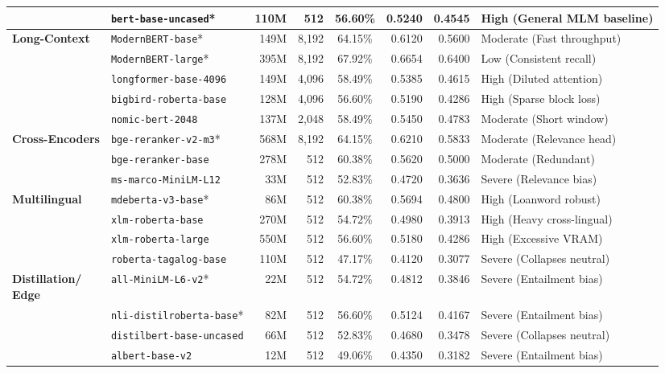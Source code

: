 \begin{landscape}
\begin{table}[p]
\begin{tabularx}{\linewidth}{>{\RaggedRight\arraybackslash}p{2.8cm}>{\RaggedRight\arraybackslash}p{4.6cm}rrcrr>{\RaggedRight\arraybackslash}X}
        & \texttt{bert-base-uncased}* & 110M & 512 & 56.60\% & 0.5240 & 0.4545 & High (General MLM baseline) \\
        \midrule
        \textbf{Long-Context} & \texttt{ModernBERT-base}* & 149M & 8,192 & 64.15\% & 0.6120 & 0.5600 & Moderate (Fast throughput) \\
        & \texttt{ModernBERT-large}* & 395M & 8,192 & 67.92\% & 0.6654 & 0.6400 & Low (Consistent recall) \\
        & \texttt{longformer-base-4096} & 149M & 4,096 & 58.49\% & 0.5385 & 0.4615 & High (Diluted attention) \\
        & \texttt{bigbird-roberta-base} & 128M & 4,096 & 56.60\% & 0.5190 & 0.4286 & High (Sparse block loss) \\
        & \texttt{nomic-bert-2048} & 137M & 2,048 & 58.49\% & 0.5450 & 0.4783 & Moderate (Short window) \\
        \midrule
        \textbf{Cross-Encoders} & \texttt{bge-reranker-v2-m3}* & 568M & 8,192 & 64.15\% & 0.6210 & 0.5833 & Moderate (Relevance head) \\
        & \texttt{bge-reranker-base} & 278M & 512 & 60.38\% & 0.5620 & 0.5000 & Moderate (Redundant) \\
        & \texttt{ms-marco-MiniLM-L12} & 33M & 512 & 52.83\% & 0.4720 & 0.3636 & Severe (Relevance bias) \\
        \midrule
        \textbf{Multilingual} & \texttt{mdeberta-v3-base}* & 86M & 512 & 60.38\% & 0.5694 & 0.4800 & High (Loanword robust) \\
        & \texttt{xlm-roberta-base} & 270M & 512 & 54.72\% & 0.4980 & 0.3913 & High (Heavy cross-lingual) \\
        & \texttt{xlm-roberta-large} & 550M & 512 & 56.60\% & 0.5180 & 0.4286 & High (Excessive VRAM) \\
        & \texttt{roberta-tagalog-base} & 110M & 512 & 47.17\% & 0.4120 & 0.3077 & Severe (Collapses neutral) \\
        \midrule
        \shortstack[l]{\textbf{Distillation/}\\\textbf{Edge}} & \texttt{all-MiniLM-L6-v2}* & 22M & 512 & 54.72\% & 0.4812 & 0.3846 & Severe (Entailment bias) \\
        & \texttt{nli-distilroberta-base}* & 82M & 512 & 56.60\% & 0.5124 & 0.4167 & Severe (Entailment bias) \\
        & \texttt{distilbert-base-uncased} & 66M & 512 & 52.83\% & 0.4680 & 0.3478 & Severe (Collapses neutral) \\
        & \texttt{albert-base-v2} & 12M & 512 & 49.06\% & 0.4350 & 0.3182 & Severe (Entailment bias) \\
        \bottomrule
    \end{tabularx}
\end{table}

\end{landscape}
\clearpage

